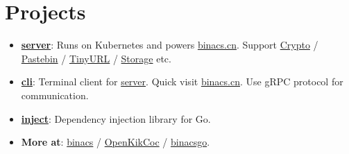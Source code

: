 \documentclass[letterpaper,12pt]{article}
\newcommand{\resumeItem}[2]{
  \item\small{
    \textbf{#1}{: #2 \vspace{-2pt}}
  }
}
\newcommand{\resumeSubItem}[2]{\resumeItem{#1}{#2}\vspace{-4pt}}
\newcommand{\resumeSubHeadingListStart}{\begin{itemize}[leftmargin=*]}
\newcommand{\resumeSubHeadingListEnd}{\end{itemize}}
\begin{document}
\section{Projects}
  \resumeSubHeadingListStart
    \resumeSubItem{\href{https://github.com/binacs/server}{server}}
      {Runs on Kubernetes and powers \href{https://binacs.cn/}{binacs.cn}.
      Support   \href{https://binacs.cn/toys/crypto}{Crypto} / 
                \href{https://binacs.cn/toys/pastebin}{Pastebin} / 
                \href{https://binacs.cn/toys/tinyurl}{TinyURL} / 
                \href{https://binacs.cn/toys/storage}{Storage}
      etc.}
    \resumeSubItem{\href{https://github.com/binacs/cli}{cli}}
      {Terminal client for \href{https://github.com/binacs/server}{server}. Quick visit
      \href{https://binacs.cn/}{binacs.cn}. Use gRPC protocol for communication.}
    \resumeSubItem{\href{https://github.com/binacsgo/inject}{inject}}
      {Dependency injection library for Go.}
    \resumeSubItem{More at}
      {\href{https://github.com/binacs}{binacs} /
       \href{https://github.com/OpenKikCoc}{OpenKikCoc} /
       \href{https://github.com/binacsgo}{binacsgo}.}
  \resumeSubHeadingListEnd

\end{document}

